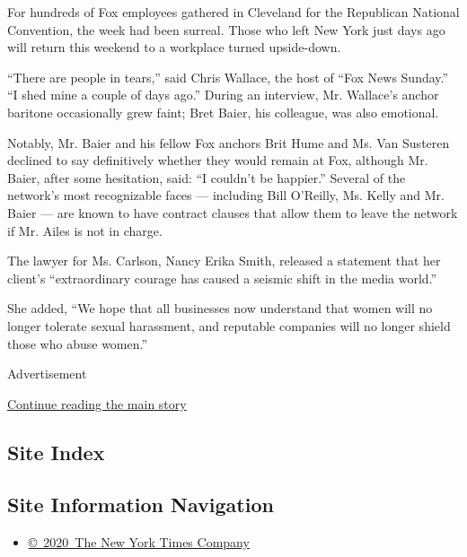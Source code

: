 For hundreds of Fox employees gathered in Cleveland for the Republican
National Convention, the week had been surreal. Those who left New York
just days ago will return this weekend to a workplace turned
upside-down.

``There are people in tears,'' said Chris Wallace, the host of ``Fox
News Sunday.'' ``I shed mine a couple of days ago.'' During an
interview, Mr. Wallace's anchor baritone occasionally grew faint; Bret
Baier, his colleague, was also emotional.

Notably, Mr. Baier and his fellow Fox anchors Brit Hume and Ms. Van
Susteren declined to say definitively whether they would remain at Fox,
although Mr. Baier, after some hesitation, said: ``I couldn't be
happier.'' Several of the network's most recognizable faces ---
including Bill O'Reilly, Ms. Kelly and Mr. Baier --- are known to have
contract clauses that allow them to leave the network if Mr. Ailes is
not in charge.

The lawyer for Ms. Carlson, Nancy Erika Smith, released a statement that
her client's ``extraordinary courage has caused a seismic shift in the
media world.''

She added, ``We hope that all businesses now understand that women will
no longer tolerate sexual harassment, and reputable companies will no
longer shield those who abuse women.''

Advertisement

\protect\hyperlink{after-bottom}{Continue reading the main story}

\hypertarget{site-index}{%
\subsection{Site Index}\label{site-index}}

\hypertarget{site-information-navigation}{%
\subsection{Site Information
Navigation}\label{site-information-navigation}}

\begin{itemize}
\tightlist
\item
  \href{https://help.nytimes3xbfgragh.onion/hc/en-us/articles/115014792127-Copyright-notice}{©~2020~The
  New York Times Company}
\end{itemize}

